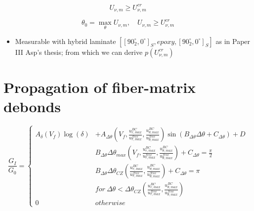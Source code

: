 \documentclass[review]{elsarticle}
\begin{document}
\begin{equation}
U_{\nu,m}\geq U_{\nu,m}^{cr}
\end{equation}

\begin{equation}
\theta_{0}=\max_{\theta}{U_{\nu,m}},\quad U_{\nu,m}\geq U_{\nu,m}^{cr}
\end{equation}

\begin{itemize}[$\rightarrow$]
\item Measurable with hybrid laminate $[[90^{\circ}_{2},0^{\circ}]_{S},epoxy,[90^{\circ}_{2},0^{\circ}]_{S}]$ as in Paper III Asp's thesis; from which we can derive $p\left(U_{\nu,m}^{cr}\right)$
\end{itemize}

\section{Propagation of fiber-matrix debonds}

\begin{equation}
\frac{G_{I}}{G_{0}}=\begin{cases}
A_{\delta}\left(V_{f}\right)\log\left(\delta\right)&+A_{\Delta\theta}\left(V_{f},\frac{u^{BC}_{r,max}}{u^{free}_{r,max}},\frac{u^{BC}_{\theta,max}}{u^{free}_{\theta,max}}\right)\sin\left(B_{\Delta\theta}\Delta\theta+C_{\Delta\theta}\right)+D\\
&B_{\Delta\theta}\Delta\theta_{max}\left(V_{f},\frac{u^{BC}_{r,max}}{u^{free}_{r,max}},\frac{u^{BC}_{\theta,max}}{u^{free}_{\theta,max}}\right)+C_{\Delta\theta}=\frac{\pi}{2}\\
&B_{\Delta\theta}\Delta\theta_{CZ}\left(\frac{u^{BC}_{r,max}}{u^{free}_{r,max}},\frac{u^{BC}_{\theta,max}}{u^{free}_{\theta,max}}\right)+C_{\Delta\theta}=\pi\\
&for\ \Delta\theta<\Delta\theta_{CZ}\left(\frac{u^{BC}_{r,max}}{u^{free}_{r,max}},\frac{u^{BC}_{\theta,max}}{u^{free}_{\theta,max}}\right)\\
0&otherwise
\end{cases}
\end{equation}
\end{document}

